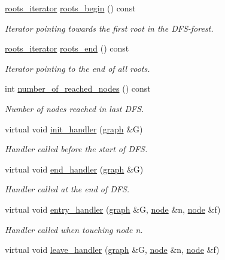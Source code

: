 \begin{DoxyCompactItemize}
\mbox{\hyperlink{classdfs_a17cb59c8a1fead11fa6b0c85cf5a478e}{roots\+\_\+iterator}} \mbox{\hyperlink{classdfs_af56fa2b736f0b924dba1257e18ba4b61}{roots\+\_\+begin}} () const
\begin{DoxyCompactList}\small\item\em Iterator pointing towards the first root in the D\+F\+S-\/forest. \end{DoxyCompactList}\item 
\mbox{\hyperlink{classdfs_a17cb59c8a1fead11fa6b0c85cf5a478e}{roots\+\_\+iterator}} \mbox{\hyperlink{classdfs_ae1a61d8c2d8d99059cab410f766ec73f}{roots\+\_\+end}} () const
\begin{DoxyCompactList}\small\item\em Iterator pointing to the end of all roots. \end{DoxyCompactList}\item 
int \mbox{\hyperlink{classdfs_ae8849a552721ad4af5d9a81c6da35822}{number\+\_\+of\+\_\+reached\+\_\+nodes}} () const
\begin{DoxyCompactList}\small\item\em Number of nodes reached in last D\+FS. \end{DoxyCompactList}\item 
virtual void \mbox{\hyperlink{classdfs_acc82574cd42ab8256e685374bee5fabb}{init\+\_\+handler}} (\mbox{\hyperlink{classgraph}{graph}} \&G)
\begin{DoxyCompactList}\small\item\em Handler called before the start of D\+FS. \end{DoxyCompactList}\item 
virtual void \mbox{\hyperlink{classdfs_ab96c7c6183856dd9e356fdcf50835b32}{end\+\_\+handler}} (\mbox{\hyperlink{classgraph}{graph}} \&G)
\begin{DoxyCompactList}\small\item\em Handler called at the end of D\+FS. \end{DoxyCompactList}\item 
virtual void \mbox{\hyperlink{classdfs_a73dabe5882226b53494a487b7c34f1d1}{entry\+\_\+handler}} (\mbox{\hyperlink{classgraph}{graph}} \&G, \mbox{\hyperlink{classnode}{node}} \&n, \mbox{\hyperlink{classnode}{node}} \&f)
\begin{DoxyCompactList}\small\item\em Handler called when touching node {\itshape n}. \end{DoxyCompactList}\item 
virtual void \mbox{\hyperlink{classdfs_a8071fc4e82deff7ceb2790cd4eb42280}{leave\+\_\+handler}} (\mbox{\hyperlink{classgraph}{graph}} \&G, \mbox{\hyperlink{classnode}{node}} \&n, \mbox{\hyperlink{classnode}{node}} \&f)

\end{DoxyCompactItemize}
